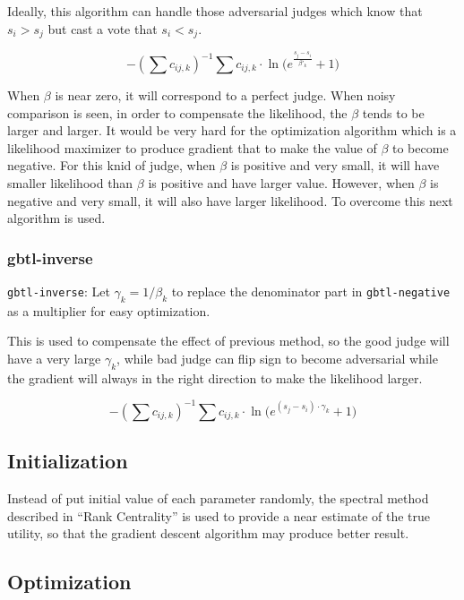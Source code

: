\documentclass[]{article}
\begin{document}
Ideally, this algorithm can handle those adversarial judges which know
that \(s_i > s_j\) but cast a vote that \(s_i < s_j\).

\[-(\sum{c_{ij, k}})^{-1} \sum{c_{ij,k} \cdot \ln({e^{\frac{s_j - s_i}{\beta'_k}} + 1}})\]

When \(\beta\) is near zero, it will correspond to a perfect judge. When
noisy comparison is seen, in order to compensate the likelihood, the
\(\beta\) tends to be larger and larger. It would be very hard for the
optimization algorithm which is a likelihood maximizer to produce
gradient that to make the value of \(\beta\) to become negative. For
this knid of judge, when \(\beta\) is positive and very small, it will
have smaller likelihood than \(\beta\) is positive and have larger
value. However, when \(\beta\) is negative and very small, it will also
have larger likelihood. To overcome this next algorithm is used.

\hypertarget{gbtl-inverse}{%
\subsubsection{gbtl-inverse}\label{gbtl-inverse}}

\texttt{gbtl-inverse}: Let \(\gamma_k = 1/\beta_k\) to replace the
denominator part in \texttt{gbtl-negative} as a multiplier for easy
optimization.

This is used to compensate the effect of previous method, so the good
judge will have a very large \(\gamma_k\), while bad judge can flip sign
to become adversarial while the gradient will always in the right
direction to make the likelihood larger.

\[-(\sum{c_{ij, k}})^{-1} \sum{c_{ij,k} \cdot \ln({e^{(s_j - s_i) \cdot \gamma_k} + 1}})\]

\hypertarget{initialization}{%
\subsection{Initialization}\label{initialization}}

Instead of put initial value of each parameter randomly, the spectral
method described in ``Rank Centrality'' is used to provide a near
estimate of the true utility, so that the gradient descent algorithm may
produce better result.

\hypertarget{optimization}{%
\subsection{Optimization}\label{optimization}}
\end{document}
